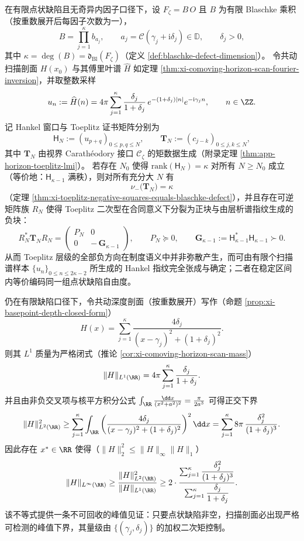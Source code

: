 \begin{proposition}\label{con:xi-toeplitz-hankel-isomorphic-split}
在有限点状缺陷且无奇异内因子口径下，设 \(F_{\zeta}=B\,O\) 且 \(B\) 为有限 Blaschke 乘积（按重数展开后每因子次数为一），
\[
B=\prod_{j=1}^{\kappa}b_{a_j},
\qquad
a_j=\mathcal{C}(\gamma_j+\mathrm{i}\delta_j)\in\mathbb{D},
\qquad
\delta_j>0,
\]
其中 \(\kappa=\deg(B)=\mathfrak d_{\mathrm{Bl}}(F_{\zeta})\)（定义 \ref{def:blaschke-defect-dimension}）。
令共动扫描剖面 \(H(x_0)\) 与其傅里叶谱 \(\widehat H\) 如定理 \ref{thm:xi-comoving-horizon-scan-fourier-inversion}，并取整数采样
\[
u_n:=\widehat H(n)
=4\pi\sum_{j=1}^{\kappa}\frac{\delta_j}{1+\delta_j}\,e^{-(1+\delta_j)|n|}e^{-\mathrm{i}\gamma_j n},
\qquad n\in\ZZ.
\]
记 Hankel 窗口与 Toeplitz 证书矩阵分别为
\[
\mathsf H_N:=(u_{p+q})_{0\le p,q\le N},
\qquad
\mathbf{T}_N:=(c_{j-k})_{0\le j,k\le N},
\]
其中 \(\mathbf{T}_N\) 由视界 Carath\'eodory 接口 \(\mathscr{C}_{\zeta}\) 的矩数据生成（附录定理 \ref{thm:app-horizon-toeplitz-lmi}）。
若存在 \(N_0\) 使得 \(\mathrm{rank}(\mathsf H_N)=\kappa\) 对所有 \(N\ge N_0\) 成立（等价地：\(\mathsf H_{\kappa-1}\) 满秩），则对所有充分大 \(N\) 有
\[
\nu_-\!\bigl(\mathbf{T}_N\bigr)=\kappa
\]
（定理 \ref{thm:xi-toeplitz-negative-squares-equals-blaschke-defect}），并且存在可逆矩阵族 \(R_N\) 使得 Toeplitz 二次型在合同意义下分裂为正块与由层析谱指纹生成的负块：
\[
R_N^{\ast}\mathbf{T}_N R_N
=
\begin{pmatrix}
P_N & 0\\
0 & -\,\mathbf{G}_{\kappa-1}
\end{pmatrix},
\qquad
P_N\succeq 0,
\qquad
\mathbf{G}_{\kappa-1}:=\mathsf H_{\kappa-1}^{\ast}\mathsf H_{\kappa-1}\succ 0.
\]
从而 Toeplitz 层级的全部负方向在制度语义中并非弥散产生，而可由有限个扫描谱样本 \(\{u_n\}_{0\le n\le 2\kappa-2}\) 所生成的 Hankel 指纹完全张成与确定；二者在稳定区间内等价编码同一组点状缺陷自由度。
\end{proposition}

\begin{proposition}\label{con:xi-poisson-profile-l1l2linfty-lower}
仍在有限缺陷口径下，令共动深度剖面（按重数展开）写作（命题 \ref{prop:xi-basepoint-depth-closed-form}）
\[
H(x)=\sum_{j=1}^{\kappa}\frac{4\delta_j}{(x-\gamma_j)^2+(1+\delta_j)^2}.
\]
则其 \(L^1\) 质量为严格闭式（推论 \ref{cor:xi-comoving-horizon-scan-mass}）
\[
\|H\|_{L^1(\RR)}=4\pi\sum_{j=1}^{\kappa}\frac{\delta_j}{1+\delta_j}.
\]
并且由非负交叉项与核平方积分公式
\(
\int_{\RR}\frac{\dd x}{(x^2+a^2)^2}=\frac{\pi}{2a^3}
\)
可得正交下界
\[
\|H\|_{L^2(\RR)}^2
\ge
\sum_{j=1}^{\kappa}
\int_{\RR}\left(\frac{4\delta_j}{(x-\gamma_j)^2+(1+\delta_j)^2}\right)^2\dd x
=
\sum_{j=1}^{\kappa}8\pi\,\frac{\delta_j^2}{(1+\delta_j)^3}.
\]
因此存在 \(x^{\ast}\in\RR\) 使得（\(\|H\|_2^2\le \|H\|_\infty\|H\|_1\)）
\[
\|H\|_{L^\infty(\RR)}
\ge
\frac{\|H\|_{L^2(\RR)}^2}{\|H\|_{L^1(\RR)}}
\ge
2\cdot
\frac{\sum_{j=1}^{\kappa}\dfrac{\delta_j^2}{(1+\delta_j)^3}}
{\sum_{j=1}^{\kappa}\dfrac{\delta_j}{1+\delta_j}}.
\]
该不等式提供一条不可回收的峰值见证：只要点状缺陷非空，扫描剖面必出现严格可检测的峰值下界，其量级由 \(\{(\gamma_j,\delta_j)\}\) 的加权二次矩控制。
\end{proposition}

